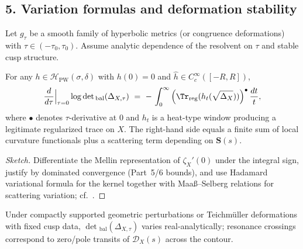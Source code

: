\subsection*{5. Variation formulas and deformation stability}\relax\hspace{0pt}
\label{subsec:tfc7-var}\relax\hspace{0pt}

Let $g_\tau$ be a smooth family of hyperbolic metrics (or congruence deformations) with $\tau\in(-\tau_0,\tau_0)$. \relax\hspace{0pt}
Assume analytic dependence of the resolvent on $\tau$ and stable cusp structure. \relax\hspace{0pt}

\begin{theorem}\relax\hspace{0pt}
\label{thm:tfc7-var}\relax\hspace{0pt}
For any $h\in\mathcal{H}_{\mathrm{PW}}(\sigma,\delta)$ with $h(0)=0$ and $\widehat{h}\in C_c^\infty([-R,R])$,
\[
\frac{d}{d\tau}\Big|_{\tau=0}\log\det{}_{\mathrm{bal}}(\Delta_{X,\tau})
\ =\ -\,\int_0^\infty \Big(\Tr_{\mathrm{reg}}(h_t(\sqrt{\Delta_{X}}))\Big)^{\bullet}\, \frac{dt}{t},
\]
where $\bullet$ denotes $\tau$-derivative at $0$ and $h_t$ is a heat-type window producing a legitimate regularized trace on $X$. The right-hand side equals a finite sum of local curvature functionals plus a scattering term depending on $\mathbf{S}(s)$. \relax\hspace{0pt}
\end{theorem}

\begin{proof}[Sketch]\relax\hspace{0pt}
Differentiate the Mellin representation of $\zeta_X'(0)$ under the integral sign, justify by dominated convergence (Part~5/6 bounds), and use Hadamard variational formula for the kernel together with Maaß--Selberg relations for scattering variation; cf.\ \cite{Muller,HeJi}. \relax\hspace{0pt}
\end{proof}

\begin{remark}\relax\hspace{0pt}
\label{rem:tfc7-stability}\relax\hspace{0pt}
Under compactly supported geometric perturbations or Teichm\"uller deformations with fixed cusp data, $\det{}_{\mathrm{bal}}(\Delta_{X,\tau})$ varies real-analytically; resonance crossings correspond to zero/pole transits of $\mathscr{D}_X(s)$ across the contour. \relax\hspace{0pt}
\end{remark}

